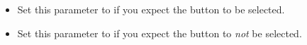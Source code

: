 \begin{itemize}
\item Set this parameter to \gdrefbooleantrue{} if you expect the button to be  selected.
\item Set this parameter to \gdrefbooleanfalse{} if you expect the button to \emph{not} be selected.
\end{itemize}

